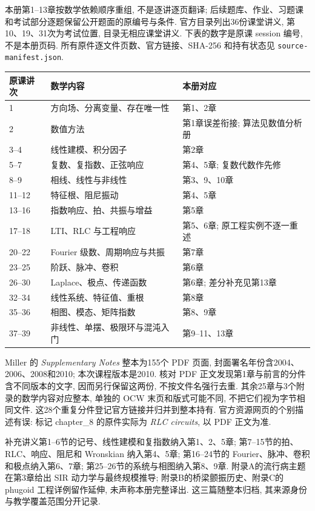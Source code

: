 本册第1--13章按数学依赖顺序重组, 不是逐讲逐页翻译; 后续题库、作业、习题课和考试部分逐题保留公开题面的原编号与条件. 官方目录列出36份课堂讲义, 第10、19、31次为考试位置, 目录无相应课堂讲义. 下表的数字是原课 session 编号, 不是本册页码. 所有原件逐文件页数、官方链接、SHA-256 和持有状态见 \texttt{source-manifest.json}.
\begin{longtable}{p{}p{}p{}}
\toprule 原课讲次 & 数学内容 & 本册对应 \\\midrule\endhead
1 & 方向场、分离变量、存在唯一性 & 第1、2章 \\
2 & 数值方法 & 第1章误差衔接; 算法见数值分析册 \\
3--4 & 线性建模、积分因子 & 第2章 \\
5--7 & 复数、复指数、正弦响应 & 第4、5章; 复数代数作先修 \\
8--9 & 相线、线性与非线性 & 第3、9、10章 \\
11--12 & 特征根、阻尼振动 & 第4、5章 \\
13--16 & 指数响应、拍、共振与增益 & 第5章 \\
17--18 & LTI、RLC 与工程响应 & 第5、6章; 原工程实例不逐一重述 \\
20--22 & Fourier 级数、周期响应与共振 & 第7章 \\
23--25 & 阶跃、脉冲、卷积 & 第6章 \\
26--30 & Laplace、极点、传递函数 & 第6章; 差分补充见第13章 \\
32--34 & 线性系统、特征值、重根 & 第8章 \\
35--36 & 相图、模态、矩阵指数 & 第8、9章 \\
37--39 & 非线性、单摆、极限环与混沌入门 & 第9--11、13章 \\
\bottomrule
\end{longtable}
Miller 的 \textit{Supplementary Notes} 整本为155个 PDF 页面, 封面署名年份含2004、2006、2008和2010; 本次课程版本是2010. 核对 PDF 正文发现第1章与前言的分件含不同版本的文字, 因而另行保留这两份, 不按文件名强行去重. 其余25章与3个附录的数学内容对应整本, 单独的 OCW 末页和版式可能不同, 不把它们视为字节相同文件. 这28个重复分件登记官方链接并归并到整本持有. 官方资源网页的个别描述有误: 标记 chapter\_8 的原件实际为 \textit{RLC circuits}, 以 PDF 正文为准.

补充讲义第1--6节的记号、线性建模和复指数纳入第1、2、5章; 第7--15节的拍、RLC、响应、阻尼和 Wronskian 纳入第4、5章; 第16--24节的 Fourier、脉冲、卷积和极点纳入第6、7章; 第25--26节的系统与相图纳入第8、9章. 附录A的流行病主题在第3章给出 SIR 动力学与最终规模推导; 附录B的桥梁颤振历史、附录C的 phugoid 工程详例留作延伸, 未声称本册完整译出. 这三篇随整本归档, 其来源身份与教学覆盖范围分开记录.

